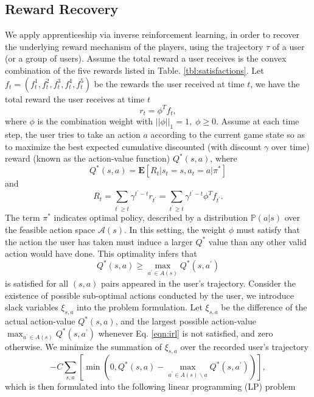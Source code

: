 \documentclass[a4paper]{article}
\begin{document}
\subsection{Reward Recovery}

We apply apprenticeship via inverse reinforcement learning, in order to recover the underlying reward mechanism of the players, using the trajectory $\tau$ of a user (or a group of users). Assume the total reward a user receives is the convex combination of the five rewards listed in Table. \ref{tbl:satisfactions}. Let $f_t=(f_t^1,f_t^2,f_t^3,f_t^4,f_t^5)$ be the rewards the user received at time $t$, we have the total reward the user receives at time $t$ $$r_t=\phi^Tf_t,$$ 
where $\phi$ is the combination weight with $||\phi||_1=1, \; \phi \geq 0$. Assume at each time step, the user tries to take an action $a$ according to the current game state so as to maximize the best expected cumulative discounted (with discount $\gamma$ over time) reward (known as the action-value function) $Q^\ast(s, a)$, where
$$Q^\ast(s,a)=\mathbf{E}[R_t | s_{t}=s, a_{t}=a | \pi^\ast]$$
and
$$R_t=\sum_{t^\prime\geq t}\gamma^{t^\prime-t}r_{t^\prime}=\sum_{t^\prime\geq t}\gamma^{t^\prime-t}\phi^Tf_{t^\prime}.$$
The term $\pi^\ast$ indicates optimal policy, described by a distribution $\mathbb{P}(a|s)$ over the feasible action space $\mathcal{A}(s)$. In this setting, the weight $\phi$ must satisfy that the action the user has taken must induce a larger $Q^\ast$ value than any other valid action would have done. This optimality infers that
\begin{equation}
Q^\ast(s,a) \geq \max_{a^\prime \in A(s)}Q^\ast(s,a^\prime) \label{eqn:irl}
\end{equation}
is satisfied for all $(s,a)$ pairs appeared in the user's trajectory. Consider the existence of possible sub-optimal actions conducted by the user, we introduce slack variables $\xi_{s,a}$ into the problem formulation. Let $\xi_{s,a}$ be the difference of the actual action-value $Q^\ast(s,a)$, and the largest possible action-value $\max_{a^\prime \in A(s)}Q^\ast(s,a^\prime)$ whenever Eq. \eqref{eqn:irl} is not satisfied, and zero otherwise. We minimize the summation of $\xi_{s,a}$ over the recorded user's trajectory
\begin{equation}
-C\sum_{s,a} \left[\min(0, Q^\ast(s,a) - \max_{a^\prime \in A(s)\backslash a}Q^\ast(s,a^\prime))\right], \label{eqn:slack}
\end{equation}
which is then formulated into the following linear programming (LP) problem
\end{document}
